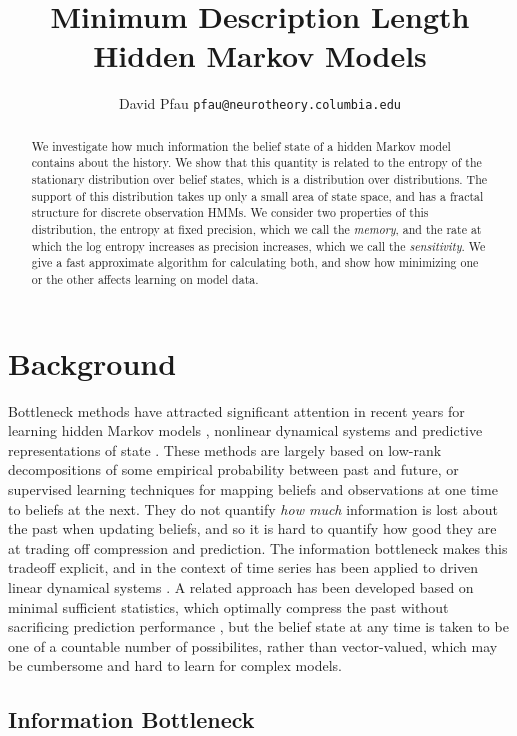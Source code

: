 \documentclass{article} %
\title{Minimum Description Length Hidden Markov Models}
\author{
David Pfau
\texttt{pfau@neurotheory.columbia.edu}
}
\begin{document}
\maketitle

\begin{abstract}
We investigate how much information the belief state of a hidden Markov model contains about the history.  We show that this quantity is related to the entropy of the stationary distribution over belief states, which is a distribution over distributions.  The support of this distribution takes up only a small area of state space, and has a fractal structure for discrete observation HMMs.  We consider two properties of this distribution, the entropy at fixed precision, which we call the {\em memory}, and the rate at which the log entropy increases as precision increases, which we call the {\em sensitivity}.  We give a fast approximate algorithm for calculating both, and show how minimizing one or the other affects learning on model data.
\end{abstract}

\section{Background}

Bottleneck methods have attracted significant attention in recent years for learning hidden Markov models \cite{Hsu2008, reduced rank hmm?}, nonlinear dynamical systems \cite{Langford2009} and predictive representations of state \cite{Boots2009,Boots2010}.  These methods are largely based on low-rank decompositions of some empirical probability between past and future, or supervised learning techniques for mapping beliefs and observations at one time to beliefs at the next.  They do not quantify {\em how much} information is lost about the past when updating beliefs, and so it is hard to quantify how good they are at trading off compression and prediction.  The information bottleneck \cite{Tishby1998} makes this tradeoff explicit, and in the context of time series has been applied to driven linear dynamical systems \cite{Creutzig2009}.  A related approach has been developed based on minimal sufficient statistics, which optimally compress the past without sacrificing prediction performance \cite{Shalizi2004}, but the belief state at any time is taken to be one of a countable number of possibilites, rather than vector-valued, which may be cumbersome and hard to learn for complex models.

\subsection{Information Bottleneck}
\end{document}
